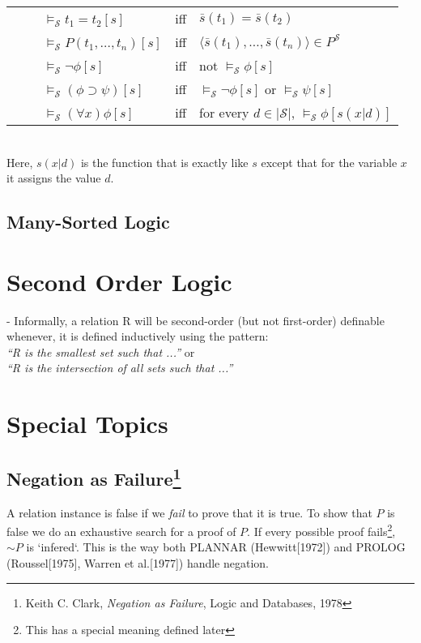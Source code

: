 \documentclass{article}
\begin{document}
\begin{tabular}{l l l}
 $\qquad$ $\vDash_\mathcal{S} t_1=t_2[s]$            &iff& $\bar{s}(t_1)=\bar{s}(t_2)$\\
 $\qquad$ $\vDash_\mathcal{S} P(t_1,\ldots,t_n)[s]$  &iff& $\langle \bar{s}(t_1),\ldots,\bar{s}(t_n)\rangle\in P^\mathcal{S}$\\
 $\qquad$ $\vDash_\mathcal{S} \neg \phi[s]$          &iff& not $\vDash_\mathcal{S} \phi[s]$\\
 $\qquad$ $\vDash_\mathcal{S} (\phi\supset \psi)[s]$ &iff& $\vDash_\mathcal{S} \neg \phi[s]$ or $\vDash_\mathcal{S} \psi[s]$\\
 $\qquad$ $\vDash_\mathcal{S} (\forall x) \phi[s]$   &iff& for every $d\in |\mathcal{S}|$, $\vDash_\mathcal{S} \phi[s(x|d)]$\\
\end{tabular}\\

 Here, $s(x|d)$ is the function that is exactly like $s$ except that for the variable $x$ it assigns the value $d$.


\subsection{Many-Sorted Logic}
\section{Second Order Logic}
- Informally, a relation R will be second-order (but not first-order) definable whenever, it is defined inductively using the pattern:\\
\emph{``R is the smallest set such that ...''} or\\
\emph{``R is the intersection of all sets such that ...''}
\section{Special Topics}
\subsection[Negation as Failure]{Negation as Failure\footnote{Keith C. Clark, \emph{Negation as Failure}, Logic and Databases, 1978}}
A relation instance is false if we \emph{fail} to prove that it is true. To show that $P$ is false we do an exhaustive search for a proof of $P$. If every possible proof fails\footnote{This has a special meaning defined later}, ${\sim} P$ is `infered`. This is the way both PLANNAR (Hewwitt[1972]) and PROLOG (Roussel[1975], Warren et al.[1977]) handle negation.\\
\end{document}

